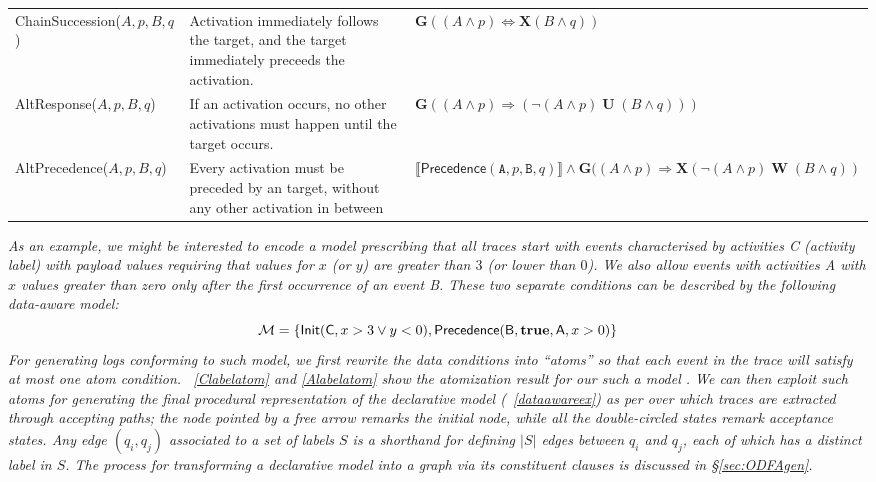 \documentclass[sigconf]{acmart}
\newcommand{\Next}{\ensuremath{\mathbf{X}}}
\newcommand{\Globally}{\ensuremath{\mathbf{G}}}
\newcommand{\Future}{\ensuremath{\mathbf{F}}}
\newcommand{\WeakUntil}[2]{\ensuremath{{#1}\;\mathbf{W}\;{#2}}}
\newcommand{\DUntil}[2]{\ensuremath{{#1}\;\mathbf{U}\;{#2}}}
\newcommand{\DeclareClause}[5]{\textsf{#1}(\texttt{#2},#3,\texttt{#4},#5)}
\begin{document}
\begin{table}[!t]
{\begin{tabular}{l|p{9cm}|l}
	  \textsf{ChainSuccession($A,p,B,q$) }  & Activation immediately follows the target, and the target immediately preceeds the activation. & $\Globally((A\wedge p)\Leftrightarrow\Next(B\wedge q))$\\
	 \textsf{AltResponse($A,p,B,q$) }  & If an activation occurs, no other activations must happen until the target occurs.  & $\Globally((A\wedge p)\Rightarrow(\DUntil{\neg(A\wedge p)}{(B\wedge q)}))$\\
	 \textsf{AltPrecedence($A,p,B,q$) }  & Every activation must be preceded by an target, without any other
	 activation in between &   $\llbracket\DeclareClause{Precedence}{A}{p}{B}{q}\rrbracket\wedge \Globally((A\wedge p)\Rightarrow \Next(\WeakUntil{\neg(A\wedge p)}{(B\wedge q)})$\\
	 
	 \bottomrule
\end{tabular}}
\end{table} 

\textit{As an example, we might be interested to encode a model prescribing that all traces start with events characterised by activities \textsc{C} (activity label) with payload values requiring that values for $x$ (or $y$) are greater than $3$ (or lower than $0$). We also allow events with activities \textsf{A} with $x$ values greater than zero only after the first occurrence of an event \textsf{B}. These two separate conditions can be described by the following data-aware model:}
\begin{equation}\label{eq:moddataaw}
\mathcal{M}=\{\textsf{Init}({\normalfont \textsf{C}},x>3\vee y< 0 ),\textsf{Precedence}({\normalfont \textsf{B}},\textbf
{true}, {\normalfont \textsf{A}},x>0)\}
\end{equation}
\textit{For generating logs conforming to such model, we first rewrite the data conditions into ``atoms'' so that each event in the trace will satisfy at most one atom condition. \tablename~\ref{Clabelatom} and \ref{Alabelatom} show the atomization result for our such a model \cite{info14030173}. We can then exploit such atoms for generating the final procedural representation of the declarative model (\figurename~\ref{dataawareex}) as per \cite{DBLP:conf/bpm/BergamiMMM21} over which traces are extracted through accepting paths; the node pointed by a free arrow remarks the initial node, while all the double-circled states remark acceptance states. Any edge $(q_i,q_j)$ associated to a set of labels $S$ is a shorthand for defining $|S|$ edges between $q_i$ and $q_j$, each of which has a distinct label in $S$. The process for transforming a declarative model into a graph via its constituent clauses is discussed in \S\ref{sec:ODFAgen}.}
\end{document}
